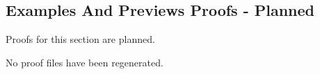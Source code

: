 \subsection*{Examples And Previews Proofs - Planned}

Proofs for this section are planned.

No proof files have been regenerated.
